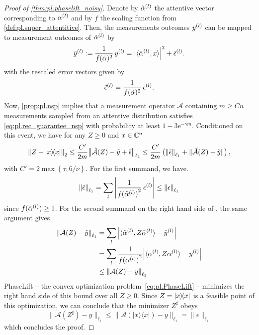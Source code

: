 \begin{proof}[Proof of \cref{thm:pl.phaselift_noisy}]
  Denote by $\tilde\alpha^{(l)}$ the attentive vector corresponding to $\alpha^{(l)}$ and by $f$ the scaling function from \cref{def:pl.super_attentitive}.
  Then, the measurements outcomes $y^{(l)}$ can be mapped to measurement outcomes of $\tilde\alpha^{(l)}$ by
  \[
    \label{eq:pl.phaselift_noisy_recr.unnormalized_measurements}
    \tilde y^{(l)}
    := \frac{1}{f(\tilde\alpha)^{2}} \, y^{(l)}
    = {\left\vert\braket{\tilde\alpha^{(l)}, x}\right\vert}^2 + \tilde\epsilon^{(l)}.
  \]
  with the rescaled error vectors given by
  \[
    \tilde\epsilon^{(l)} = \frac{1}{f(\tilde\alpha)^{2}} \, \epsilon^{(l)}.
  \]
  Now, \cref{prop:pl.nsp} implies that a measurement operator $\tilde{\mathcal{A}}$ containing $m \geq C n$ measurements sampled from an attentive distribution satisfies \cref{eq:pl.rec_guarantee_nsp} with probability at least $1-3 \mathrm{e}^{-\gamma m}$.
  Conditioned on this event, we have for any $Z \ge 0$ and $x \in {\mathbb{C}}^n$
  \[
    \Fnorm{Z - \ketbra{x}}
    \le \frac{C'}{2m} \Norm{\tilde{\mathcal{A}}(Z) - \tilde y + \tilde \epsilon}_{\ell_1}
    \le \frac{C'}{2m} \left( \norm{\tilde \epsilon}_{\ell_1} + \norm{\tilde{\mathcal{A}}(Z) - \tilde y} \right),
    \label{eq:phaselift_noisy_recr.findal_bound}
  \]
  with $C' = 2 \max \left\{\tau, 6/\nu \right\}$.
  For the first summand, we have.
  \[
    {\Vert\tilde\epsilon\Vert}_{\ell_1}  = \sum_l {\left\vert  \frac{1}{{f(\tilde\alpha^{(l)})}^2} \, \epsilon^{(l)}\right\vert} \le {\Vert\epsilon\Vert}_{\ell_1}
  \]
  since $f(\tilde\alpha^{(l)}) \ge 1$.
  For the second summand on the right hand side of , the same argument gives
  \begin{align}
    {\Vert\tilde{\mathcal{A}}(Z) - \tilde y\Vert}_{\ell_1}
    &= \sum_l {\left\vert  \braket{\tilde\alpha^{(l)}, Z \tilde\alpha^{(l)}} - \tilde y^{(l)}  \right\vert} \\
    &= \sum_l \frac{1}{{f(\tilde\alpha^{(l)})}^2}  {\left\vert \braket{\alpha^{(l)}, Z \alpha^{(l)}} - y^{(l)}  \right\vert} \\
    &\le {\Vert\mathcal{A}(Z) - y\Vert}_{\ell_1}
  \end{align}
  PhaseLift -- the convex optimization problem~\eqref{eq:pl.PhaseLift} -- minimizes the right hand side of this bound over all $Z \geq 0$.
  Since $Z = \ketbra{x}$ is a feasible point of this optimization, we can conclude that the minimizer $Z^\sharp$ obeys
  \[
    \| \mathcal{A}( Z^\sharp) - {y} \|_{\ell_1} \leq \| \mathcal{A}(|{x} \rangle \! \langle {x}|)-{y} \|_{\ell_1} = \| {\epsilon} \|_{\ell_1}
  \]
  which concludes the proof.
\end{proof}

